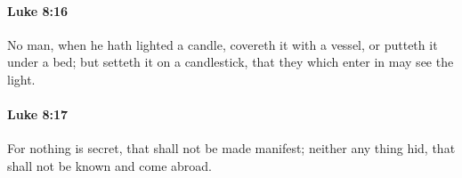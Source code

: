 		\paragraph{Luke 8:16} %
			\label{LUKE-8-16}

			No man, when he hath lighted a candle, covereth it with a vessel, or putteth it under a bed; but setteth it on a candlestick, that they which enter in may see the light.

			\begin{framed}
			\scriptsize
				\begin{compactdesc}
					\item[SBLG] 
				\end{compactdesc}
			\end{framed}

		\paragraph{Luke 8:17} %
			\label{LUKE-8-17}

			For nothing is secret, that shall not be made manifest; neither any thing hid, that shall not be known and come abroad.

